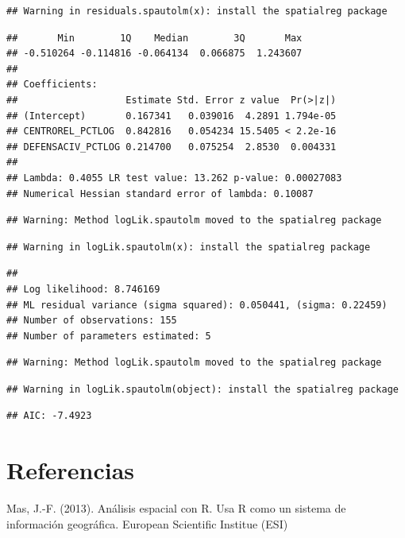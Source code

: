 \documentclass[11pt,]{article}
\begin{document}
\begin{verbatim}
## Warning in residuals.spautolm(x): install the spatialreg package
\end{verbatim}

\begin{verbatim}
##       Min        1Q    Median        3Q       Max 
## -0.510264 -0.114816 -0.064134  0.066875  1.243607 
## 
## Coefficients: 
##                   Estimate Std. Error z value  Pr(>|z|)
## (Intercept)       0.167341   0.039016  4.2891 1.794e-05
## CENTROREL_PCTLOG  0.842816   0.054234 15.5405 < 2.2e-16
## DEFENSACIV_PCTLOG 0.214700   0.075254  2.8530  0.004331
## 
## Lambda: 0.4055 LR test value: 13.262 p-value: 0.00027083 
## Numerical Hessian standard error of lambda: 0.10087
\end{verbatim}

\begin{verbatim}
## Warning: Method logLik.spautolm moved to the spatialreg package
\end{verbatim}

\begin{verbatim}
## Warning in logLik.spautolm(x): install the spatialreg package
\end{verbatim}

\begin{verbatim}
## 
## Log likelihood: 8.746169 
## ML residual variance (sigma squared): 0.050441, (sigma: 0.22459)
## Number of observations: 155 
## Number of parameters estimated: 5
\end{verbatim}

\begin{verbatim}
## Warning: Method logLik.spautolm moved to the spatialreg package
\end{verbatim}

\begin{verbatim}
## Warning in logLik.spautolm(object): install the spatialreg package
\end{verbatim}

\begin{verbatim}
## AIC: -7.4923
\end{verbatim}

\section{Referencias}\label{referencias}

Mas, J.-F. (2013). Análisis espacial con R. Usa R como un sistema de
información geográfica. European Scientific Institue (ESI)
\end{document}
